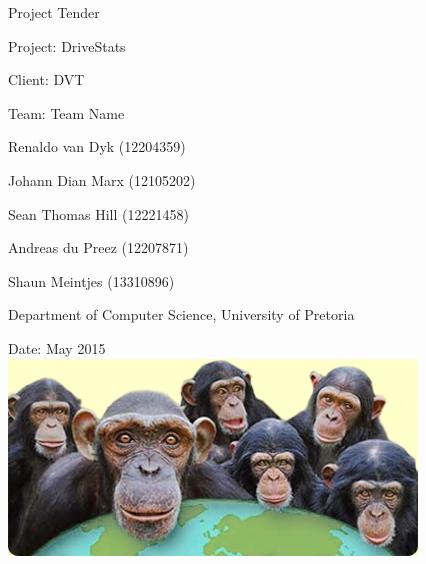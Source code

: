 \documentclass[12pt, oneside]{article}
\begin{document}
\thispagestyle{empty}
\begin{center}
\begin{minipage}{0.9\linewidth}
    \centering


    {\normalsize Project Tender\par}
    \vspace{1cm}
    {\Large Project: DriveStats\par}
{\normalsize Client: DVT\par}
    \vspace{1cm}
   {\Large Team: Team Name\par}
    {\normalsize Renaldo van Dyk (12204359)\par}
    {\normalsize Johann Dian Marx (12105202)\par}
    {\normalsize Sean Thomas Hill (12221458)\par}
    {\normalsize Andreas du Preez (12207871)\par}
    {\normalsize Shaun Meintjes (13310896)\par}
{\normalsize Department of Computer Science, University of Pretoria\par}
    \vspace{1cm}

 {\normalsize Date: May 2015}
\vspace{1cm}
    \includegraphics[scale=0.9]{example1} %

    \vspace{1cm}
    
\end{minipage}
\end{center}
\clearpage

\newpage
\end{document}

